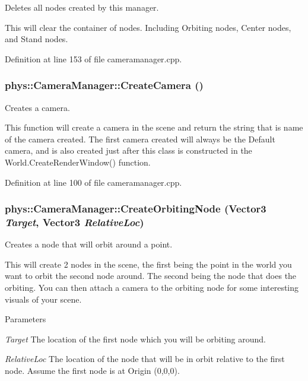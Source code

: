 Deletes all nodes created by this manager. 

This will clear the container of nodes. Including Orbiting nodes, Center nodes, and Stand nodes. 

Definition at line 153 of file cameramanager.cpp.

\hypertarget{classphys_1_1CameraManager_ac6ff80c91fa5a2cd21ebd8b78db9add2}{
\subsubsection[{CreateCamera}]{ phys::CameraManager::CreateCamera ()}}
\label{d9/d91/classphys_1_1CameraManager_ac6ff80c91fa5a2cd21ebd8b78db9add2}


Creates a camera. 

This function will create a camera in the scene and return the string that is name of the camera created. The first camera created will always be the Default camera, and is also created just after this class is constructed in the World.CreateRenderWindow() function. 

Definition at line 100 of file cameramanager.cpp.

\hypertarget{classphys_1_1CameraManager_a9a696ea09f174a69bbc6d0bb179b3de4}{
\subsubsection[{CreateOrbitingNode}]{ phys::CameraManager::CreateOrbitingNode ({\bf Vector3} {\em Target}, \/  {\bf Vector3} {\em RelativeLoc})}}
\label{d9/d91/classphys_1_1CameraManager_a9a696ea09f174a69bbc6d0bb179b3de4}


Creates a node that will orbit around a point. 

This will create 2 nodes in the scene, the first being the point in the world you want to orbit the second node around. The second being the node that does the orbiting. You can then attach a camera to the orbiting node for some interesting visuals of your scene. 
\begin{DoxyParams}{Parameters}
\item[{\em Target}]The location of the first node which you will be orbiting around. \item[{\em RelativeLoc}]The location of the node that will be in orbit relative to the first node. Assume the first node is at Origin (0,0,0). \end{DoxyParams}



